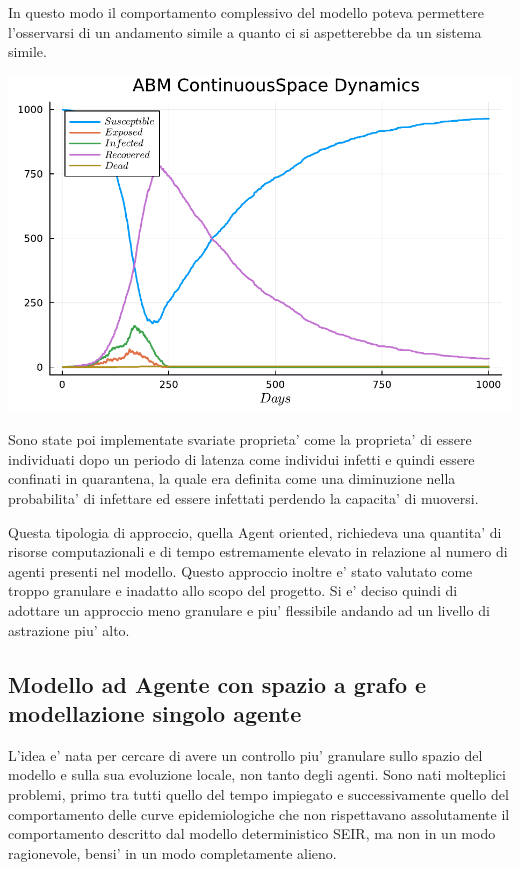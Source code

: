In questo modo il comportamento complessivo del modello poteva permettere l'osservarsi 
di un andamento simile a quanto ci si aspetterebbe da un sistema simile.

\begin{minipage}{\linewidth}
    \centering
    \includegraphics[width=\textwidth]{img/plot_abm_continuousspace.pdf}
    \label{fig:seir_curve_continuous}
\end{minipage}

Sono state poi implementate svariate proprieta' come la proprieta' di essere individuati 
dopo un periodo di latenza come individui infetti e quindi essere confinati in quarantena, 
la quale era definita come una diminuzione nella probabilita' di infettare ed essere infettati 
perdendo la capacita' di muoversi.

Questa tipologia di approccio, quella Agent oriented, richiedeva una quantita' di risorse computazionali 
e di tempo estremamente elevato in relazione al numero di agenti presenti nel modello. Questo approccio 
inoltre e' stato valutato come troppo granulare e inadatto allo scopo del progetto. 
Si e' deciso quindi di adottare un approccio meno granulare e piu' flessibile 
andando ad un livello di astrazione piu' alto.

\subsection{Modello ad Agente con spazio a grafo e modellazione singolo agente}
L'idea e' nata per cercare di avere un controllo piu' granulare sullo spazio del modello e sulla sua 
evoluzione locale, non tanto degli agenti. Sono nati molteplici problemi, primo tra tutti quello del tempo impiegato
e successivamente quello del comportamento delle curve epidemiologiche che non rispettavano 
assolutamente il comportamento descritto dal modello deterministico SEIR, ma non in un modo 
ragionevole, bensi' in un modo completamente alieno. 

